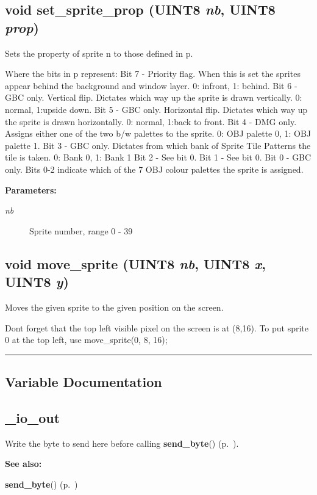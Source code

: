 \subsection{\setlength{\rightskip}{0pt plus 5cm}void set\_\-sprite\_\-prop ({\bf UINT8} {\em nb}, {\bf UINT8} {\em prop})}

Sets the property of sprite n to those defined in p.

Where the bits in p represent: Bit 7 - Priority flag. When this is set the sprites appear behind the background and window layer. 0: infront, 1: behind. Bit 6 - GBC only. Vertical flip. Dictates which way up the sprite is drawn vertically. 0: normal, 1:upside down. Bit 5 - GBC only. Horizontal flip. Dictates which way up the sprite is drawn horizontally. 0: normal, 1:back to front. Bit 4 - DMG only. Assigns either one of the two b/w palettes to the sprite. 0: OBJ palette 0, 1: OBJ palette 1. Bit 3 - GBC only. Dictates from which bank of Sprite Tile Patterns the tile is taken. 0: Bank 0, 1: Bank 1 Bit 2 - See bit 0. Bit 1 - See bit 0. Bit 0 - GBC only. Bits 0-2 indicate which of the 7 OBJ colour palettes the sprite is assigned.

\begin{Desc}
\item[{\bf Parameters: }]\par
\begin{description}
\item[
{\em nb}] Sprite number, range 0 - 39 \end{description}
\end{Desc}
\label{gb.h_a94}
\subsection{\setlength{\rightskip}{0pt plus 5cm}void move\_\-sprite ({\bf UINT8} {\em nb}, {\bf UINT8} {\em x}, {\bf UINT8} {\em y})}

Moves the given sprite to the given position on the screen.

Dont forget that the top left visible pixel on the screen is at (8,16). To put sprite 0 at the top left, use move\_\-sprite(0, 8, 16); \vspace{0.4cm}\hrule\vspace{0.2cm}
\subsection*{Variable Documentation}
\label{gb.h_a105}
\subsection{ \_\-io\_\-out}

Write the byte to send here before calling {\bf send\_\-byte}() {\rm (p.~\pageref{gb.h_a65})}.

\begin{Desc}
\item[{\bf See also: }]\par
{\bf send\_\-byte}() {\rm (p.~\pageref{gb.h_a65})} \end{Desc}
